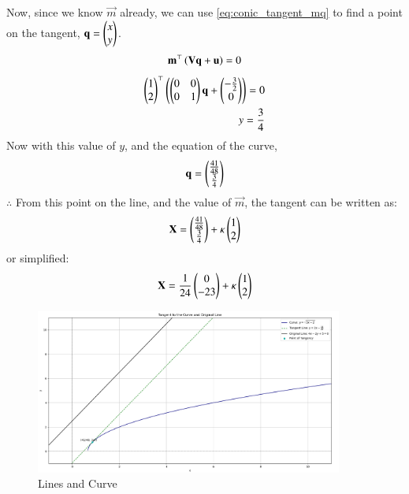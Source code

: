 \documentclass[journal]{IEEEtran}
\begin{document}
Now, since we know $\vec{m}$ already, we can use \eqref{eq:conic_tangent_mq} to find a point on the tangent, $\mathbf{q}=\begin{pmatrix}x\\y\end{pmatrix}$.
\begin{align}
    \mathbf{m}^{\top}\left(\mathbf{V}\mathbf{q}+\mathbf{u}\right)=0
\end{align}
\begin{align}
    \begin{pmatrix}1\\2\end{pmatrix}^{\top}\left(\begin{pmatrix}0&0\\0&1\end{pmatrix}\mathbf{q}+\begin{pmatrix}-\frac{3}{2}\\0\end{pmatrix}\right)=0\\
    y=\frac{3}{4}
\end{align}
Now with this value of $y$, and the equation of the curve,
\begin{align}
    \mathbf{q}=\begin{pmatrix}\frac{41}{48}\\ \frac{3}{4}\end{pmatrix}
\end{align}
$\therefore$ From this point on the line, and the value of $\vec{m}$, the tangent can be written as:
\begin{align}
    \mathbf{X}=\begin{pmatrix}\frac{41}{48}\\\frac{3}{4}\end{pmatrix} + \kappa \begin{pmatrix}1\\2\end{pmatrix}
\end{align}
or simplified:
\begin{align}
    \mathbf{X}=\frac{1}{24}\begin{pmatrix}0\\-23\end{pmatrix} + \kappa \begin{pmatrix}1\\2\end{pmatrix}
\end{align}


\newpage
\begin{figure}[h!]
\begin{center}
	\includegraphics[width=0.9\textwidth]{figs/Figure_1.png}
	\caption{Lines and Curve}
	\label{fig:9-9.3-15 - Figure -1}
\end{center}
\end{figure}
\end{document}
